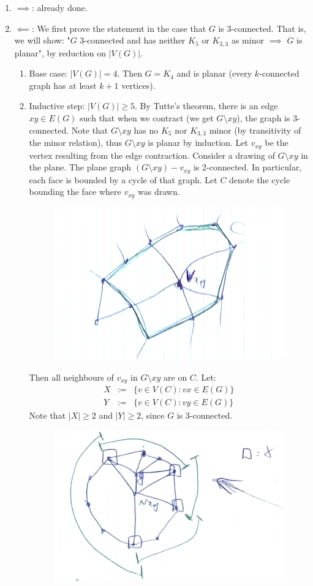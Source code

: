 \documentclass[11pt]{book}
\begin{document}
		\begin{enumerate}
			\item $\implies$: already done.
			\item $\impliedby$: We first prove the statement in the case that $G$ is 3-connected. That is, we will show: "$G$ 3-connected and has neither $K_5$ or $K_{3,3}$ as minor $\implies$ $G$ is planar", by reduction on $|V(G)|$.
				\begin{enumerate}
					\item Base case: $|V(G)| = 4$. Then $G = K_4$ and is planar (every $k$-connected graph has at least $k+1$ vertices).
					\item Inductive step: $|V(G)| \geq 5$. By Tutte's theorem, there is an edge $xy \in E(G)$ such that when we contract (we get $G \setminus xy$), the graph is 3-connected. Note that $G \setminus xy$ has no $K_5$ nor $K_{3,3}$ minor (by transitivity of the minor relation), thus $G \setminus xy$ is planar by induction. Let $v_{xy}$ be the vertex resulting from the edge contraction. Consider a drawing of $G \setminus xy$ in the plane. The plane graph $(G \setminus xy) - v_{xy}$ is 2-connected. In particular, each face is bounded by a cycle of that graph. Let $C$ denote the cycle bounding the face where $v_{xy}$ was drawn.
\begin{figure}[h]
	\center
	\includegraphics[width=0.3\linewidth]{img/4-1.png}
\end{figure}

Then all neighbours of $v_{xy}$ in $G \setminus xy$ are on $C$. Let:
						\begin{eqnarray}
							X &:=& \{ v \in V(C) : vx \in E(G)\}\\
							Y &:=& \{ v \in V(C) : vy \in E(G) \}
						\end{eqnarray}
						Note that $|X| \geq 2$ and $|Y| \geq 2$, since $G$ is 3-connected.\\
						\begin{figure}[h]
	\center
	\includegraphics[width=0.3\linewidth]{img/4-2.png}
\end{figure}


\end{enumerate}
\end{enumerate}
\end{document}

